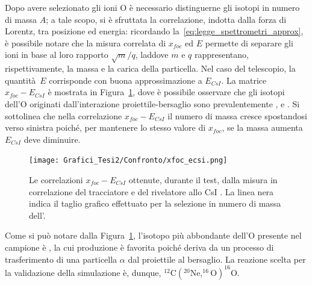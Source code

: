 Dopo avere selezionato gli ioni O è necessario distinguerne gli isotopi in numero di massa $A$; a tale scopo, si è sfruttata la correlazione, indotta dalla forza di Lorentz, tra posizione ed energia: ricordando la~\ref{eq:legge_spettrometri_approx}, è possibile notare che la misura correlata di $x_{foc}$ ed $E$ permette di separare gli ioni in base al loro rapporto $\sqrt{m}/q$, laddove $m$ e $q$ rappresentano, rispettivamente, la massa e la carica della particella.
Nel caso del telescopio, la quantità~$E$ corrisponde con buona approssimazione a $E_{CsI}$.
La matrice $x_{foc} - E_{CsI}$ è mostrata in Figura~\ref{fig:xfoc2_csi_standard}, dove è possibile osservare che gli isotopi dell'O originati dall'interazione proiettile-bersaglio sono prevalentemente ,  e .
Si sottolinea che nella correlazione $x_{foc} - E_{CsI}$ il numero di massa cresce spostandosi verso sinistra poiché, per mantenere lo stesso valore di $x_{foc}$, se la massa aumenta $E_{CsI}$ deve diminuire.
\begin{figure} [!p]
	\centering
	\texttt{[image: Grafici\_Tesi2/Confronto/xfoc\_ecsi.png]}
	\caption{Le correlazioni $x_{foc} - E_{CsI}$ ottenute, durante il test, dalla misura in correlazione del tracciatore e del rivelatore allo CsI . La linea nera indica il taglio grafico effettuato per la selezione in numero di massa dell'.} \label{fig:xfoc2_csi_standard}
\end{figure}
Come si può notare dalla Figura~\ref{fig:xfoc2_csi_standard}, l'isotopo più abbondante dell'O presente nel campione è , la cui produzione è favorita poiché deriva da un processo di trasferimento di una particella $\alpha$ dal proiettile al bersaglio. 
La reazione scelta per la validazione della simulazione è, dunque, $^{12}\mbox{C}  ( ^{20}\mbox{Ne}, ^{16}\mbox{O} )  ^{16}\mbox{O} $.





\subsection{}



